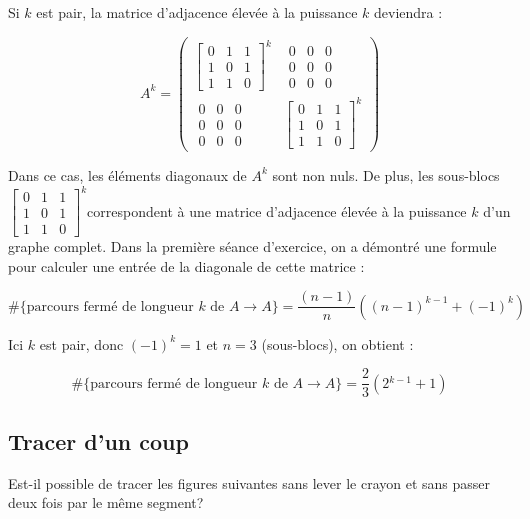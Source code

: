 \begin{solution}
Si $k$ est pair, la matrice d'adjacence élevée à la puissance $k$
deviendra :

\[
A^{k}=\left(\begin{array}{cc}
\left[\begin{array}{ccc}
0 & 1 & 1\\
1 & 0 & 1\\
1 & 1 & 0
\end{array}\right]^{k} & \begin{array}{ccc}
0 & 0 & 0\\
0 & 0 & 0\\
0 & 0 & 0
\end{array}\\
\begin{array}{ccc}
0 & 0 & 0\\
0 & 0 & 0\\
0 & 0 & 0
\end{array} & \left[\begin{array}{ccc}
0 & 1 & 1\\
1 & 0 & 1\\
1 & 1 & 0
\end{array}\right]^{k}
\end{array}\right)
\]


Dans ce cas, les éléments diagonaux de $A^{k}$ sont non nuls. De
plus, les sous-blocs $\left[\begin{array}{ccc}
0 & 1 & 1\\
1 & 0 & 1\\
1 & 1 & 0
\end{array}\right]^{k}$correspondent à une matrice d'adjacence élevée à la puissance $k$
d'un graphe complet. Dans la première séance d'exercice, on a démontré
une formule pour calculer une entrée de la diagonale de cette matrice
:

\[
\#\{\text{parcours fermé de longueur }k\text{ de }A\rightarrow A\}=\frac{(n-1)}{n}((n-1)^{k-1}+(-1)^{k})
\]


Ici $k$ est pair, donc $(-1)^{k}=1$ et $n=3$ (sous-blocs), on obtient
:

\[
\#\{\text{parcours fermé de longueur }k\text{ de }A\rightarrow A\}=\frac{2}{3}(2{}^{k-1}+1)
\]
\end{solution}

\subsection{Tracer d'un coup} Est-il possible de tracer les figures suivantes sans lever le crayon et sans passer deux fois par le même segment?

